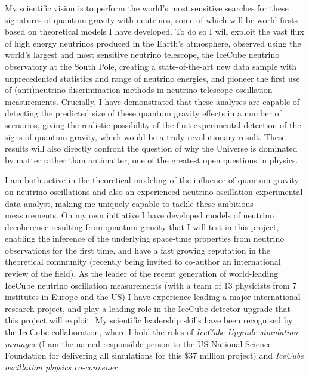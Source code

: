 \documentclass[a4paper,11pt]{article}
\begin{document}
My scientific vision is to perform the world's most sensitive searches for these signatures of quantum gravity with neutrinos, some of which will be world-firsts based on theoretical models I have developed. To do so I will exploit the vast flux of high energy neutrinos produced in the Earth's atmosphere, observed using the world's largest and most sensitive neutrino telescope, the IceCube neutrino observatory at the South Pole, creating a state-of-the-art new data sample with unprecedented statistics and range of neutrino energies, and pioneer the first use of (anti)neutrino discrimination methods in neutrino telescope oscillation measurements. Crucially, I have demonstrated that these analyses are capable of detecting the predicted size of these quantum gravity effects in a number of scenarios, giving the realistic possibility of the first experimental detection of the signs of quantum gravity, which would be a truly revolutionary result. These results will also directly confront the question of why the Universe is dominated by matter rather than antimatter, one of the greatest open questions in physics.

I am both active in the theoretical modeling of the influence of quantum gravity on neutrino oscillations and also an experienced neutrino oscillation experimental data analyst, making me uniquely capable to tackle these ambitious measurements. On my own initiative I have developed models of neutrino decoherence resulting from quantum gravity that I will test in this project, enabling the inference of the underlying space-time properties from neutrino observations for the first time, and have a fast growing reputation in the theoretical community (recently being invited to co-author an international review of the field). As the leader of the recent generation of world-leading IceCube neutrino oscillation measurements (with a team of 13 physicists from 7 institutes in Europe and the US) I have experience leading a major international research project, and play a leading role in the IceCube detector upgrade that this project will exploit. My scientific leadership skills have been recognised by the IceCube collaboration, where I hold the roles of \textit{IceCube Upgrade simulation manager} (I am the named responsible person to the US National Science Foundation for delivering all simulations for this \$37 million project) and \textit{IceCube oscillation physics co-convener}. \\

\end{document}
